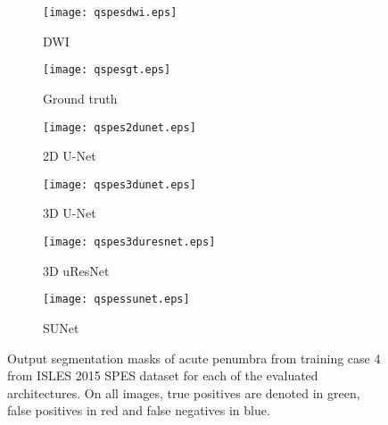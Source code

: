 \documentclass[letterpaper,final,authoryear,3p,times,twocolumn]{elsarticle}
\begin{document}
\def\qsubfig{0.162\textwidth}
\begin{figure*}
	\centering
	\begin{subfigure}[b]{\qsubfig}
		\texttt{[image: qspesdwi.eps]}
		\caption{DWI}
	\end{subfigure}
	\begin{subfigure}[b]{\qsubfig}
		\texttt{[image: qspesgt.eps]}
		\caption{Ground truth}
	\end{subfigure}
	\begin{subfigure}[b]{\qsubfig}
		\texttt{[image: qspes2dunet.eps]}
		\caption{2D U-Net}
	\end{subfigure} 
	\begin{subfigure}[b]{\qsubfig}
		\texttt{[image: qspes3dunet.eps]}
		\caption{3D U-Net}
	\end{subfigure}
	\begin{subfigure}[b]{\qsubfig}
		\texttt{[image: qspes3duresnet.eps]}
		\caption{3D uResNet}
	\end{subfigure}
	\begin{subfigure}[b]{\qsubfig}
		\texttt{[image: qspessunet.eps]}
		\caption{SUNet}
	\end{subfigure}
	\caption{Output segmentation masks of acute penumbra from training case 4 from ISLES 2015 SPES dataset for each of the evaluated architectures. On all images, true positives are denoted in green, false positives in red and false negatives in blue.}
	\label{fig:qspes}
\end{figure*}
\end{document}
